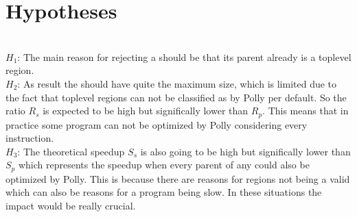 \section{Hypotheses}
\\
\(H_1\): The main reason for rejecting a \scop should be that its parent already is a toplevel region.\\
\(H_2\): As result the \scops should have quite the maximum size, which is limited due to the fact that toplevel regions can not be classified as \scops by Polly per default.
So the ratio \(R_s\) is expected to be high but significally lower than \(R_p\).
This means that in practice some program can not be optimized by Polly considering every instruction.\\
\(H_3\): The theoretical speedup \(S_s\) is also going to be high but significally lower than \(S_p\) which represents the speedup when every parent of any \scop could also be optimized by Polly.
This is because there are reasons for regions not being a valid \scop which can also be reasons for a program being slow.
In these situations the impact would be really crucial.

